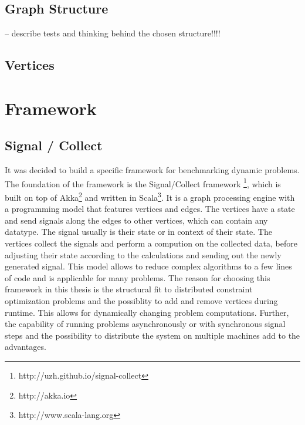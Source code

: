 \subsection{Graph Structure}

-- describe tests and thinking behind the chosen structure!!!!

\subsection{Vertices}

\section{Framework}

\subsection{Signal / Collect}

It was decided to build a specific framework for benchmarking dynamic problems. The foundation of the framework is the Signal/Collect framework \cite{Stutz2010}\footnote{http://uzh.github.io/signal-collect}, which is built on top of Akka\footnote{http://akka.io} and written in Scala\footnote{http://www.scala-lang.org}. It is a graph processing engine with a programming model that features vertices and edges. The vertices have a state and send signals along the edges to other vertices, which can contain any datatype. The signal usually is their state or in context of their state. The vertices collect the signals and perform a compution on the collected data, before adjusting their state according to the calculations and sending out the newly generated signal.  This model allows to reduce complex algorithms to a few lines of code and is applicable for many problems. The reason for choosing this framework in this thesis is the structural fit to distributed constraint optimization problems and the possiblity to add and remove vertices during runtime. This allows for dynamically changing problem computations. Further, the capability of running problems asynchronously or with synchronous signal steps and the possibility to distribute the system on multiple machines add to the advantages.

